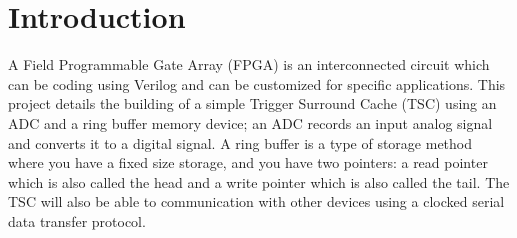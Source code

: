 \section{Introduction}
A Field Programmable Gate Array (FPGA) is an interconnected circuit which can be coding using Verilog and can be customized for specific applications.
This project details the building of a simple Trigger Surround Cache (TSC) using an ADC and a ring buffer memory device; an ADC records an input analog signal and converts it to a digital signal.
A ring buffer is a type of storage method where you have a fixed size storage, and you have two pointers: a read pointer which is also called the head and a write pointer which is also called the tail.
The TSC will also be able to communication with other devices using a clocked serial data transfer protocol.
